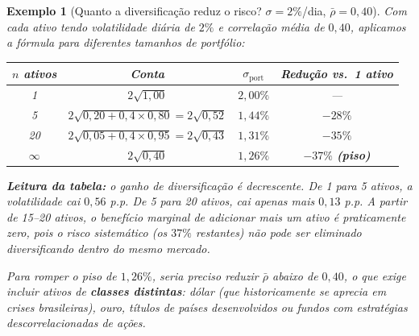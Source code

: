 \documentclass[11pt,a4paper]{article}
\theoremstyle{quant}
\newtheorem{exemplo}{Exemplo}[section]
\begin{document}
\begin{exemplo}[Quanto a diversificação reduz o risco? $\sigma = 2\%$/dia, $\bar\rho = 0{,}40$]
Com cada ativo tendo volatilidade diária de $2\%$ e correlação média de $0{,}40$,
aplicamos a fórmula para diferentes tamanhos de portfólio:

\vspace{0.3em}
\begin{center}
\begin{tabular}{@{}cccc@{}}
\toprule
\textcolor{quantpurple}{\textbf{$n$ ativos}} &
\textcolor{quantpurple}{\textbf{Conta}} &
\textcolor{quantpurple}{\textbf{$\sigma_\text{port}$}} &
\textcolor{quantpurple}{\textbf{Redução vs.\ 1 ativo}} \\
\midrule
1          & $2\sqrt{1{,}00}$                               & $2{,}00\%$ & ---      \\[3pt]
5          & $2\sqrt{0{,}20 + 0{,}4\times0{,}80} = 2\sqrt{0{,}52}$ & $1{,}44\%$ & $-28\%$  \\[3pt]
20         & $2\sqrt{0{,}05 + 0{,}4\times0{,}95} = 2\sqrt{0{,}43}$ & $1{,}31\%$ & $-35\%$  \\[3pt]
$\infty$   & $2\sqrt{0{,}40}$                               & $1{,}26\%$ & $-37\%$ \textbf{(piso)} \\
\bottomrule
\end{tabular}
\end{center}

\vspace{0.5em}
\textbf{Leitura da tabela:} o ganho de diversificação é decrescente. De 1 para 5 ativos,
a volatilidade cai $0{,}56$ p.p. De 5 para 20 ativos, cai apenas mais $0{,}13$ p.p.
A partir de 15--20 ativos, o benefício marginal de adicionar mais um ativo é
praticamente zero, pois o risco sistemático (os $37\%$ restantes) não pode ser
eliminado diversificando dentro do mesmo mercado.

Para romper o piso de $1{,}26\%$, seria preciso reduzir $\bar\rho$ abaixo de $0{,}40$,
o que exige incluir ativos de \textbf{classes distintas}: dólar (que historicamente
se aprecia em crises brasileiras), ouro, títulos de países desenvolvidos ou fundos
com estratégias descorrelacionadas de ações.
\end{exemplo}
\end{document}
